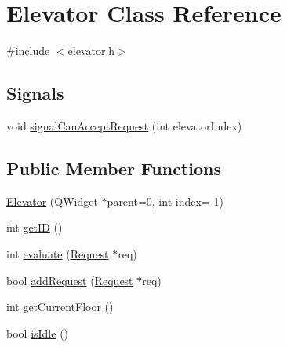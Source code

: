\hypertarget{class_elevator}{
\section{Elevator Class Reference}
\label{class_elevator}
}


{\ttfamily \#include $<$elevator.h$>$}

\subsection*{Signals}
\begin{DoxyCompactItemize}
\item 
void \hyperlink{class_elevator_a688a7f343cc5d4ceec45feea140ccba2}{signalCanAcceptRequest} (int elevatorIndex)
\end{DoxyCompactItemize}
\subsection*{Public Member Functions}
\begin{DoxyCompactItemize}
\item 
\hyperlink{class_elevator_a1d3d0e6613a99a780dc2a14935ed47ec}{Elevator} (QWidget $\ast$parent=0, int index=-\/1)
\item 
int \hyperlink{class_elevator_aca5f48d0086a5791d6fa822c4efc4d96}{getID} ()
\item 
int \hyperlink{class_elevator_a2e9a499fe4d2b2ccff043d3798399743}{evaluate} (\hyperlink{class_request}{Request} $\ast$req)
\item 
bool \hyperlink{class_elevator_aaef88b9050a598bfc711e0f4a55711d0}{addRequest} (\hyperlink{class_request}{Request} $\ast$req)
\item 
int \hyperlink{class_elevator_a333ca5f86534823e1efda55e48c36abe}{getCurrentFloor} ()
\item 
bool \hyperlink{class_elevator_a64dc8a888c4ae8914a2ce640b3104c39}{isIdle} ()
\end{DoxyCompactItemize}
